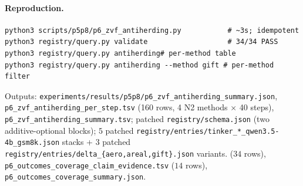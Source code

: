 \paragraph{Reproduction.}
\begin{verbatim}
python3 scripts/p5p8/p6_zvf_antiherding.py           # ~3s; idempotent
python3 registry/query.py validate                   # 34/34 PASS
python3 registry/query.py antiherding# per-method table
python3 registry/query.py antiherding --method gift # per-method filter
\end{verbatim}
Outputs: \texttt{experiments/results/p5p8/p6\_zvf\_antiherding\_summary.json},
\texttt{p6\_zvf\_antiherding\_per\_step.tsv} (160 rows, 4 N2 methods
$\times$ 40 steps), \texttt{p6\_zvf\_antiherding\_summary.tsv}; patched
\texttt{registry/schema.json} (two additive-optional blocks);
$5$ patched \texttt{registry/entries/tinker\_*\_qwen3.5-4b\_gsm8k.json}
stacks + $3$ patched \texttt{registry/entries/delta\_\{aero,areal,gift\}.json}
variants.
($34$ rows), \texttt{p6\_outcomes\_coverage\_claim\_evidence.tsv}
($14$ rows), \texttt{p6\_outcomes\_coverage\_summary.json}.
